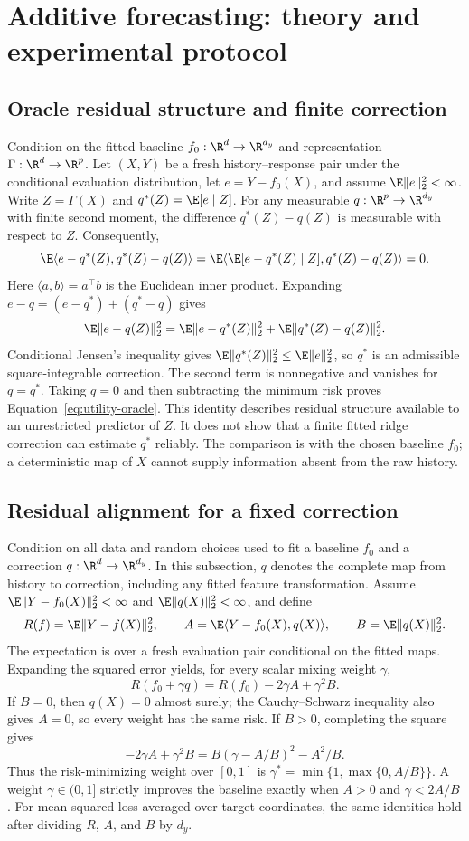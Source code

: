 \section{Additive forecasting: theory and experimental protocol}
\label{app:utility}

\subsection{Oracle residual structure and finite correction}
\label{app:utility-projection}
Condition on the fitted baseline $f_0:\R^d\to\R^{d_y}$ and
representation $\Gamma:\R^d\to\R^p$. Let $(X,Y)$ be a fresh
history--response pair under the conditional evaluation distribution,
let $e=Y-f_0(X)$, and assume $\E\|e\|_2^2<\infty$.
Write $Z=\Gamma(X)$ and $q^*(Z)=\E[e\mid Z]$. For any measurable
$q:\R^p\to\R^{d_y}$ with finite second moment, the difference
$q^*(Z)-q(Z)$ is measurable with respect to $Z$. Consequently,
\[
 \E\langle e-q^*(Z),q^*(Z)-q(Z)\rangle
 =\E\langle\E[e-q^*(Z)\mid Z],q^*(Z)-q(Z)\rangle=0.
\]
Here $\langle a,b\rangle=a^\top b$ is the Euclidean inner product.
Expanding $e-q=(e-q^*)+(q^*-q)$ gives
\[
 \E\|e-q(Z)\|_2^2
 =\E\|e-q^*(Z)\|_2^2+\E\|q^*(Z)-q(Z)\|_2^2.
\]
Conditional Jensen's inequality gives
$\E\|q^*(Z)\|_2^2\leq\E\|e\|_2^2$, so $q^*$ is an admissible
square-integrable correction. The second term is nonnegative and
vanishes for $q=q^*$. Taking $q=0$
and then subtracting the minimum risk proves
Equation~\eqref{eq:utility-oracle}. This identity describes residual
structure available to an unrestricted predictor of $Z$. It does not
show that a finite fitted ridge correction can estimate $q^*$ reliably.
The comparison is with the chosen baseline $f_0$; a deterministic map
of $X$ cannot supply information absent from the raw history.

\subsection{Residual alignment for a fixed correction}
\label{app:utility-alignment}
Condition on all data and random choices used to fit a baseline $f_0$
and a correction $q:\R^d\to\R^{d_y}$. In this subsection, $q$ denotes
the complete map from history to correction, including any fitted
feature transformation. Assume
$\E\|Y-f_0(X)\|_2^2<\infty$ and $\E\|q(X)\|_2^2<\infty$, and define
\[
 R(f)=\E\|Y-f(X)\|_2^2,\qquad
 A=\E\langle Y-f_0(X),q(X)\rangle,\qquad
 B=\E\|q(X)\|_2^2.
\]
The expectation is over a fresh evaluation pair conditional on the
fitted maps. Expanding the squared error yields, for every scalar
mixing weight $\gamma$,
\[
 R(f_0+\gamma q)=R(f_0)-2\gamma A+\gamma^2B.
\]
If $B=0$, then $q(X)=0$ almost surely; the Cauchy--Schwarz inequality
also gives $A=0$, so every weight has the same risk. If $B>0$, completing
the square gives
\[
 -2\gamma A+\gamma^2B=B(\gamma-A/B)^2-A^2/B.
\]
Thus the risk-minimizing weight over $[0,1]$ is
$\gamma^*=\min\{1,\max\{0,A/B\}\}$. A weight
$\gamma\in(0,1]$ strictly improves the baseline exactly when
$A>0$ and $\gamma<2A/B$. For mean squared loss averaged over target
coordinates, the same identities hold after dividing $R$, $A$, and
$B$ by $d_y$.

